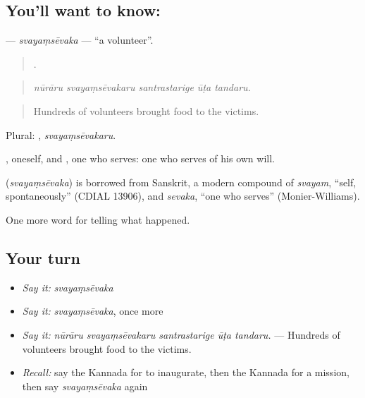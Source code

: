 \subsection*{You'll want to know: }
\textbf{} — \emph{svayaṃsēvaka} — \textquotedblleft{}a volunteer\textquotedblright{}.

\begin{quote}
    .
\end{quote}

\begin{quote}
\emph{nūrāru svayaṃsēvakaru santrastarige ūṭa tandaru.}
\end{quote}

\begin{quote}
Hundreds of volunteers brought food to the victims.
\end{quote}

Plural: , \emph{svayaṃsēvakaru}.

, oneself, and , one who serves: one who serves of his own will.

\begin{cousinweb}
\textbf{} (\emph{svayaṃsēvaka}) is borrowed from Sanskrit, a modern compound of \emph{svayam}, \textquotedblleft{}self, spontaneously\textquotedblright{} (CDIAL 13906), and \emph{sevaka}, \textquotedblleft{}one who serves\textquotedblright{} (Monier-Williams).
\end{cousinweb}

\begin{grammarlens}[title={What you've built}]
One more word for telling what happened.
\end{grammarlens}

\subsection*{Your turn}
\begin{itemize}
\raggedright
  \item \emph{Say it:} \emph{svayaṃsēvaka}
  \item \emph{Say it:} \emph{svayaṃsēvaka}, once more
  \item \emph{Say it:} \emph{nūrāru svayaṃsēvakaru santrastarige ūṭa tandaru.} — Hundreds of volunteers brought food to the victims.
  \item \emph{Recall:} say the Kannada for to inaugurate, then the Kannada for a mission, then say \emph{svayaṃsēvaka} again
\end{itemize}


